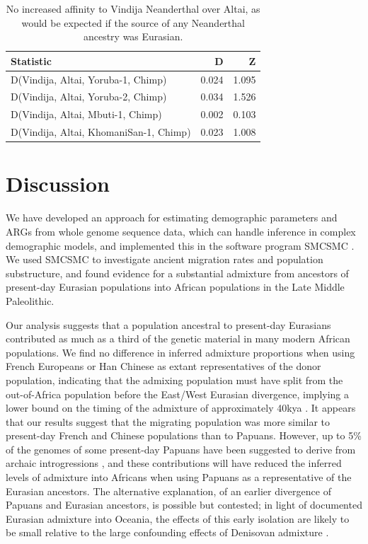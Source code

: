 \begin{table}[ht]
\centering
\begin{tabular}{lrr}
  \hline
Statistic & D & Z \\ 
  \hline
D(Vindija, Altai, Yoruba-1, Chimp) & 0.024 & 1.095 \\ 
  D(Vindija, Altai, Yoruba-2, Chimp) & 0.034 & 1.526 \\ 
  D(Vindija, Altai, Mbuti-1, Chimp) & 0.002 & 0.103 \\ 
  D(Vindija, Altai, KhomaniSan-1, Chimp) & 0.023 & 1.008 \\ 
    \hline
\end{tabular}
\caption{No increased affinity to Vindija Neanderthal over Altai, as would be expected if the source of any Neanderthal ancestry was Eurasian.} 
\label{dstats:a6}
\end{table}



\section{Discussion}
We have developed an approach for estimating demographic parameters and ARGs from whole genome sequence data, which can handle inference in complex demographic models, and implemented this in the software program SMCSMC \cite{Henderson2018}. We used SMCSMC to investigate ancient migration rates and population substructure, and found evidence for a substantial admixture from ancestors of present-day Eurasian populations into African populations in the Late Middle Paleolithic.

Our analysis suggests that a population ancestral to present-day Eurasians contributed as much as a third of the genetic material in many modern African populations. We find no difference in inferred admixture proportions when using French Europeans or Han Chinese as extant representatives of the donor population, indicating that the admixing population must have split from the out-of-Africa population before the East/West Eurasian divergence, implying a lower bound on the timing of the admixture of approximately 40kya \cite{Mathieson2014}. It appears that our results suggest that the migrating population was more similar to present-day French and Chinese populations than to Papuans.  However, up to 5\% of the genomes of some present-day Papuans have been suggested to derive from archaic introgressions \cite{Sankararaman2016}, and these contributions will have reduced the inferred levels of admixture into Africans when using Papuans as a representative of the Eurasian ancestors.
The alternative explanation, of an earlier divergence of Papuans and Eurasian ancestors, is possible but contested; in light of documented Eurasian admixture into Oceania, the effects of this early isolation are likely to be small relative to the large confounding effects of Denisovan admixture \cite{Malaspinas2016, Nielsen2017a}.

